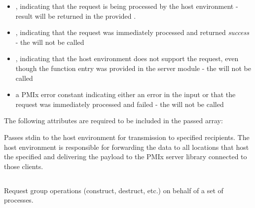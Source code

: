 \begin{itemize}
    \item {}, indicating that the request is being processed by the host environment - result will be returned in the provided .
    \item {}, indicating that the request was immediately processed and returned \textit{success} - the  will not be called
    \item {}, indicating that the host environment does not support the request, even though the function entry was provided in the server module - the  will not be called
    \item a PMIx error constant indicating either an error in the input or that the request was immediately processed and failed - the  will not be called
\end{itemize}

\reqattrstart
The following attributes are required to be included in the passed  array:


\reqattrend

\descr

Passes stdin to the host environment for transmission to specified recipients. The host environment is responsible for forwarding the data to all locations that host the specified  and delivering the payload to the \ac{PMIx} server library connected to those clients.

\subsection{}

\summary

Request group operations (construct, destruct, etc.) on behalf of a set of processes.

\format

